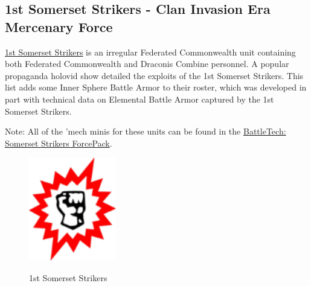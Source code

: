 \subsection{1st Somerset Strikers - Clan Invasion Era Mercenary Force}

\href{https://www.sarna.net/wiki/1st_Somerset_Strikers}{1st Somerset Strikers} is an irregular Federated Commonwealth unit containing both Federated Commonwealth and Draconis Combine personnel.
A popular propaganda holovid show detailed the exploits of the 1st Somerset Strikers.
This list adds some Inner Sphere Battle Armor to their roster, which was developed in part with technical data on Elemental Battle Armor captured by the 1st Somerset Strikers.

Note: All of the 'mech minis for these units can be found in the  \href{https://www.sarna.net/wiki/BattleTech:_Somerset_Strikers_ForcePack}{BattleTech: Somerset Strikers ForcePack}.

\begin{figure}[!h]
  \centering
  \includegraphics[alt='1st Somerset Strikers Logo', width=1.5in, height=1.778in]{img/1st-Somerset-Strikers.png}
  \caption*{1st Somerset Strikers}
\end{figure}

